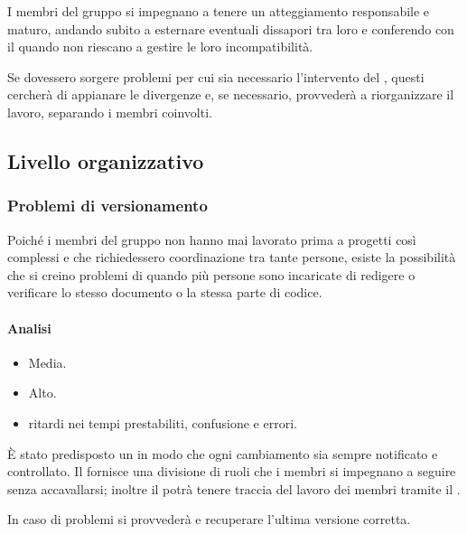 \documentclass[a4paper, titlepage]{article}
\begin{document}
	I membri del gruppo si impegnano a tenere un atteggiamento responsabile e maturo, andando subito a esternare eventuali dissapori tra loro e conferendo con il  quando non riescano a gestire le loro incompatibilità.
	
	Se dovessero sorgere problemi per cui sia necessario l'intervento del , questi cercherà di appianare le divergenze e, se necessario, provvederà a riorganizzare il lavoro, separando i membri coinvolti.
	
	
	\subsection{Livello organizzativo}
	\subsubsection{Problemi di versionamento}
	Poiché i membri del gruppo non hanno mai lavorato prima a progetti così complessi e che richiedessero coordinazione tra tante persone, esiste la possibilità che si creino problemi di  quando più persone sono incaricate di redigere o verificare lo stesso documento o la stessa parte di codice.
	
	\paragraph {Analisi}
	\begin{itemize}
		\item {} Media.
		\item {} Alto.
		\item {} ritardi nei tempi prestabiliti, confusione e errori.
	\end{itemize}
	
	È stato predisposto un  in modo che ogni cambiamento sia sempre notificato e controllato. Il  fornisce una divisione di ruoli che i membri si impegnano a seguire senza accavallarsi; inoltre il  potrà tenere traccia del lavoro dei membri tramite il  .
	
	In caso di problemi si provvederà e recuperare l'ultima versione corretta.
	
\end{document}
